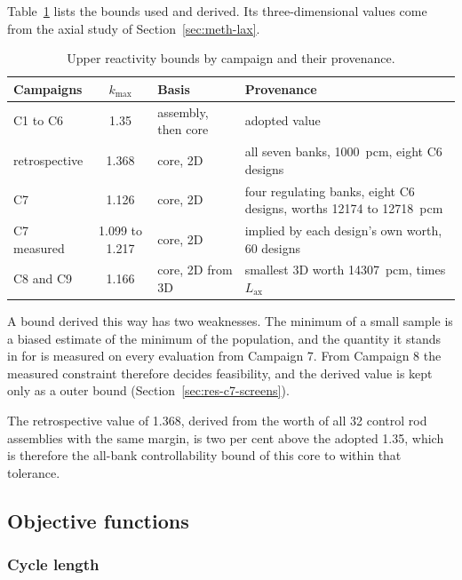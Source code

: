 Table~\ref{tab:ctrl-bounds} lists the bounds used and derived. Its
three-dimensional values come from the axial study of
Section~\ref{sec:meth-lax}.

\begin{table}[htbp]
  \centering
  \caption{Upper reactivity bounds by campaign and their provenance.}
  \label{tab:ctrl-bounds}
  \small
  \begin{tabularx}{\textwidth}{@{}>{\raggedright\arraybackslash}p{}c>{\raggedright\arraybackslash}p{}>{\raggedright\arraybackslash}X@{}}
    \toprule
    Campaigns & $k_{\max}$ & Basis & Provenance \\
    \midrule
    C1 to C6 & 1.35  & assembly, then core & adopted value \\
    retrospective & 1.368 & core, 2D & all seven banks, \SI{1000}{pcm}, eight C6 designs \\
    C7 & 1.126 & core, 2D & four regulating banks, eight C6 designs, worths \num{12174} to \SI{12718}{pcm} \\
    C7 measured & 1.099 to 1.217 & core, 2D & implied by each design's own worth, 60 designs \\
    C8 and C9 & 1.166 & core, 2D from 3D & smallest 3D worth \SI{14307}{pcm}, times $L_\mathrm{ax}$ \\
    \bottomrule
  \end{tabularx}
\end{table}

A bound derived this way has two weaknesses. The minimum of a small
sample is a biased estimate of the minimum of the population, and the
quantity it stands in for is measured on every evaluation from Campaign
7. From Campaign 8 the measured constraint therefore decides feasibility,
and the derived value is kept only as a outer bound
(Section~\ref{sec:res-c7-screens}).

The retrospective value of 1.368, derived from the worth of all 32
control rod assemblies with the same margin, is two per cent above the
adopted 1.35, which is therefore the all-bank controllability bound of
this core to within that tolerance.


\subsection{Objective functions}
\label{sec:objective_functions}

\subsubsection{Cycle length}

